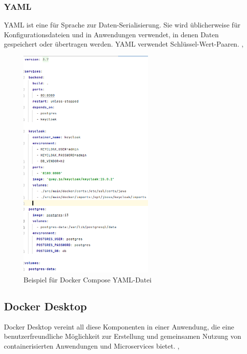 \subsubsection{YAML}
YAML ist eine für Sprache zur Daten-Serialisierung. Sie wird üblicherweise für Konfigurationsdateien 
und in Anwendungen verwendet, in denen Daten gespeichert oder übertragen werden. YAML verwendet Schlüssel-Wert-Paaren. \cite{noauthor_yaml_2022}, \cite{noauthor_einfuhrung_2021}

\begin{figure}[H]
  \includegraphics[width=0.6\textwidth]{pics/Bsp_Docker-composeYML.PNG}
  \centering
  \caption{Beispiel für Docker Compose YAML-Datei}
\end{figure}

\subsection{Docker Desktop}
Docker Desktop vereint all diese Komponenten in einer Anwendung, die eine 
benutzerfreundliche Möglichkeit zur Erstellung und gemeinsamen Nutzung von containerisierten 
Anwendungen und Microservices bietet. \cite{noauthor_docker_nodate-3}, \cite{noauthor_install_nodate-1}


